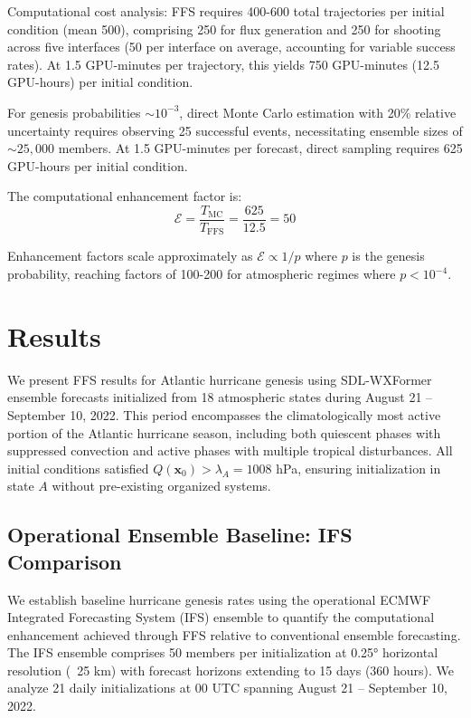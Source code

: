 \documentclass[11pt]{article}
\begin{document}
Computational cost analysis: FFS requires 400-600 total trajectories per initial condition (mean 500), comprising 250 for flux generation and 250 for shooting across five interfaces (50 per interface on average, accounting for variable success rates). At 1.5 GPU-minutes per trajectory, this yields 750 GPU-minutes (12.5 GPU-hours) per initial condition.

For genesis probabilities $\sim 10^{-3}$, direct Monte Carlo estimation with 20\% relative uncertainty requires observing 25 successful events, necessitating ensemble sizes of $\sim 25,000$ members. At 1.5 GPU-minutes per forecast, direct sampling requires 625 GPU-hours per initial condition.

The computational enhancement factor is:
\begin{equation}
\mathcal{E} = \frac{T_{\text{MC}}}{T_{\text{FFS}}} = \frac{625}{12.5} = 50
\end{equation}

Enhancement factors scale approximately as $\mathcal{E} \propto 1/p$ where $p$ is the genesis probability, reaching factors of 100-200 for atmospheric regimes where $p < 10^{-4}$.
\section{Results}

We present FFS results for Atlantic hurricane genesis using SDL-WXFormer ensemble forecasts initialized from 18 atmospheric states during August 21 -- September 10, 2022. This period encompasses the climatologically most active portion of the Atlantic hurricane season, including both quiescent phases with suppressed convection and active phases with multiple tropical disturbances. All initial conditions satisfied $Q(\mathbf{x}_0) > \lambda_A = 1008$ hPa, ensuring initialization in state $A$ without pre-existing organized systems.

\subsection{Operational Ensemble Baseline: IFS Comparison}

We establish baseline hurricane genesis rates using the operational ECMWF Integrated Forecasting System (IFS) ensemble to quantify the computational enhancement achieved through FFS relative to conventional ensemble forecasting. The IFS ensemble comprises 50 members per initialization at 0.25° horizontal resolution (~25 km) with forecast horizons extending to 15 days (360 hours). We analyze 21 daily initializations at 00 UTC spanning August 21 -- September 10, 2022.
\end{document}
